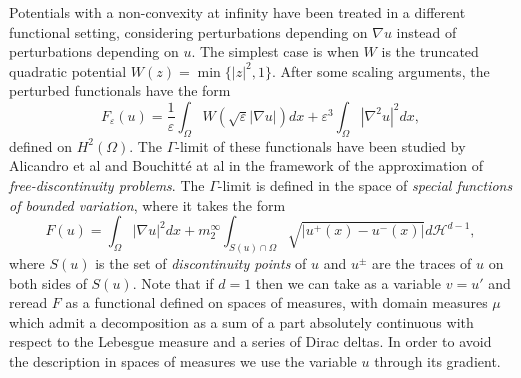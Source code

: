 \documentclass{article}
\newcommand{\e}{\varepsilon}
\begin{document}
\smallskip
Potentials with a non-convexity at infinity have been treated in a different functional setting, considering perturbations depending on $\nabla u$ instead of perturbations depending on $u$. The simplest case is when $W$ is the truncated quadratic potential $W(z)=\min\{|z|^2,1\}$. After some scaling arguments, the perturbed functionals  have the form
\begin{equation}\label{4}
F_\e(u)=\frac1\e\int_\Omega W(\sqrt\e |\nabla u|)dx+ \e^3 \int_\Omega|\nabla^2 u|^2dx,
\end{equation}
defined on $H^2(\Omega)$. The $\Gamma$-limit of these functionals have been studied by Alicandro et al \cite{ABG} and Bouchitt\'e at al \cite{bouds} in the framework of the approximation of {\em free-discontinuity problems}. The $\Gamma$-limit is defined in the space of {\em special functions of bounded variation}, where it
takes the form
\begin{equation}\label{4}
F(u)=\int_\Omega |\nabla u|^2 dx+ m^\infty_2 \int_{S(u)\cap\Omega}\sqrt{|u^+(x)-u^-(x)|}d\mathcal H^{d-1},
\end{equation}
where $S(u)$ is the set of {\em discontinuity points} of $u$ and $u^\pm$ are the traces of $u$ on both sides of $S(u)$. Note that if $d=1$ then we can take as a variable $v=u'$ and reread $F$ as a functional defined on spaces of measures, with domain measures $\mu$ which admit a decomposition as a sum of a part absolutely continuous with respect to the Lebesgue measure and a series of Dirac deltas. In order to avoid the description in spaces of measures we use the variable $u$ through its gradient. 
\end{document}
